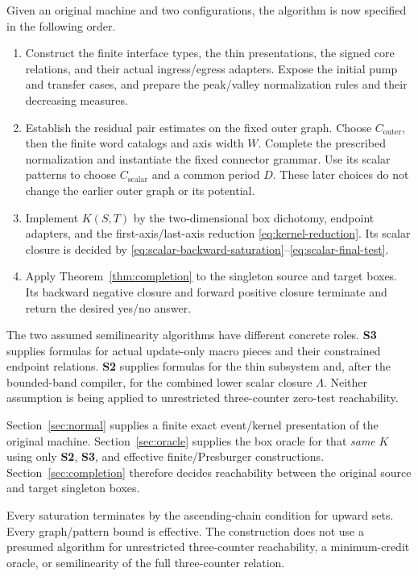 \documentclass[11pt,a4paper]{article}
\theoremstyle{remark}
\newcommand{\Co}{C_{\mathrm{outer}}}
\newcommand{\Cs}{C_{\mathrm{scalar}}}
\begin{document}
Given an original machine and two configurations, the algorithm is now
specified in the following order.
\begin{enumerate}[leftmargin=*]
\item Construct the finite interface types, the thin presentations,
the signed core relations, and their actual ingress/egress adapters.
Expose the initial pump and transfer cases, and prepare the
peak/valley normalization rules and their decreasing measures.
\item Establish the residual pair estimates on the fixed outer graph.
Choose \(\Co\), then the finite word catalogs and axis width \(W\).
Complete the prescribed normalization and instantiate the fixed
connector grammar. Use its scalar patterns to choose \(\Cs\) and a common period
\(D\). These later choices do not change the earlier outer graph or
its potential.
\item Implement \(K(S,T)\) by the two-dimensional box dichotomy,
endpoint adapters, and the first-axis/last-axis reduction
\eqref{eq:kernel-reduction}. Its scalar closure is decided by
\eqref{eq:scalar-backward-saturation}--\eqref{eq:scalar-final-test}.
\item Apply Theorem~\ref{thm:completion} to the singleton source and
target boxes. Its backward negative closure and forward positive
closure terminate and return the desired yes/no answer.
\end{enumerate}

The two assumed semilinearity algorithms have different concrete roles.
\textbf{S3} supplies formulas for actual update-only macro pieces and
their constrained endpoint relations. \textbf{S2} supplies formulas
for the thin subsystem and, after the bounded-band compiler, for the
combined lower scalar closure \(\Lambda\). Neither assumption is
being applied to unrestricted three-counter zero-test reachability.

Section~\ref{sec:normal} supplies a finite exact event/kernel presentation of the original machine. Section~\ref{sec:oracle} supplies the box oracle for that \emph{same} \(K\) using only \textbf{S2}, \textbf{S3}, and effective finite/Presburger constructions. Section~\ref{sec:completion} therefore decides reachability between the original source and target singleton boxes.

Every saturation terminates by the ascending-chain condition for upward sets. Every graph/pattern bound is effective. The construction does not use a presumed algorithm for unrestricted three-counter reachability, a minimum-credit oracle, or semilinearity of the full three-counter relation.
\end{document}
